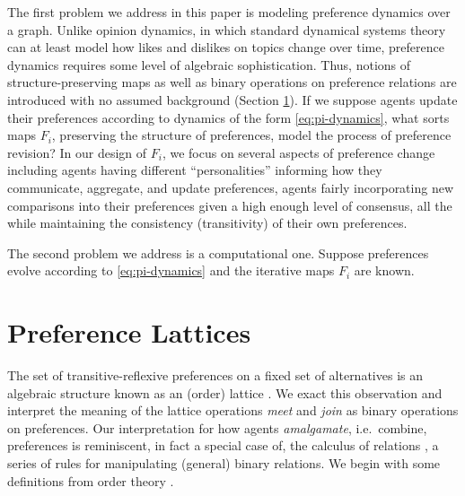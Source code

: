 \documentclass[conference]{ieeeconf}
\newcommand{\N}{\mathcal{N}}
\newcommand{\A}{\mathcal{A}}
\newcommand{\prefers}{\succsim}
\newcommand{\profile}{\boldsymbol{\pi}}
\newcommand{\metaprefers}{\sqsupseteq}
\begin{document}
The first problem we address in this paper is modeling preference dynamics over a graph. Unlike opinion dynamics, in which standard dynamical systems theory can at least model how likes and dislikes on topics change over time, preference dynamics requires some level of algebraic sophistication. Thus, notions of structure-preserving maps as well as binary operations on preference relations are introduced with no assumed background (Section \ref{sec:lattices}). If we suppose agents update their preferences according to dynamics of the form \eqref{eq:pi-dynamics}, what sorts maps $F_i$, preserving the structure of preferences, model the process of preference revision? In our design of $F_i$, we focus on several aspects of preference change including agents having different ``personalities'' informing how they communicate, aggregate, and update preferences, agents fairly incorporating new comparisons into their preferences given a high enough level of consensus, all the while maintaining the consistency (transitivity) of their own preferences.

The second problem we address is a computational one. Suppose preferences evolve according to \eqref{eq:pi-dynamics} and the iterative maps $F_i$ are known.


\section{Preference Lattices}
\label{sec:lattices}

The set of transitive-reflexive preferences on a fixed set of alternatives is an algebraic structure known as an (order) lattice \cite{birkhoff1940}. We exact this observation and interpret the meaning of the lattice operations \emph{meet} and \emph{join} as binary operations on preferences. Our interpretation for how agents \emph{amalgamate}, i.e.~combine, preferences is reminiscent, in fact a special case of, the calculus of relations \cite{tarski1941}, a series of rules for manipulating (general) binary relations. We begin with some definitions from order theory \cite{roman2008}.
\end{document}
